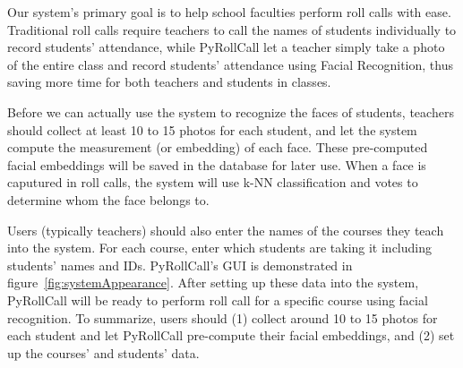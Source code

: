 Our system's primary goal is to help school faculties perform roll calls with ease.
Traditional roll calls require teachers to call the names of students individually to record students' attendance,
while PyRollCall let a teacher simply take a photo of the entire class and record students' attendance
using Facial Recognition, thus saving more time for both teachers and students in classes.
\vspace{0.5cm}

Before we can actually use the system to recognize the faces of students, teachers should
collect at least 10 to 15 photos for each student, and let the system compute the measurement (or embedding) of each face.
These pre-computed facial embeddings will be saved in the database for later use.
When a face is caputured in roll calls, the system will use k-NN classification and votes
to determine whom the face belongs to.
\vspace{0.5cm}

Users (typically teachers) should also enter the names of the courses they teach into the system.
For each course, enter which students are taking it including students' names and IDs.
PyRollCall's GUI is demonstrated in figure~\ref{fig:systemAppearance}. 
After setting up these data into the system, PyRollCall will be ready to perform roll call for a specific course
using facial recognition. To summarize, users should (1) collect around 10 to 15 photos for each student and
let PyRollCall pre-compute their facial embeddings, and (2) set up the courses' and students' data.
\vspace{0.5cm}

